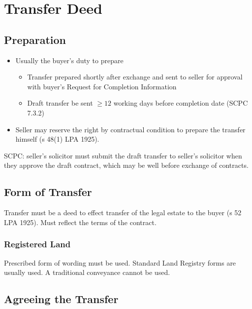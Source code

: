 \documentclass[
]{article}
\providecommand{\tightlist}{%
  \setlength{\itemsep}{0pt}\setlength{\parskip}{0pt}}
\begin{document}
\hypertarget{transfer-deed}{%
\section{Transfer Deed}\label{transfer-deed}}

\hypertarget{preparation}{%
\subsection{Preparation}\label{preparation}}

\begin{itemize}
\tightlist
\item
  Usually the buyer's duty to prepare

  \begin{itemize}
  \tightlist
  \item
    Transfer prepared shortly after exchange and sent to seller for
    approval with buyer's Request for Completion Information
  \item
    Draft transfer be sent \(\geq 12\) working days before completion
    date (SCPC 7.3.2)
  \end{itemize}
\item
  Seller may reserve the right by contractual condition to prepare the
  transfer himself (s 48(1) LPA 1925).
\end{itemize}

SCPC: seller's solicitor must submit the draft transfer to seller's
solicitor when they approve the draft contract, which may be well before
exchange of contracts.

\hypertarget{form-of-transfer}{%
\subsection{Form of Transfer}\label{form-of-transfer}}

Transfer must be a deed to effect transfer of the legal estate to the
buyer (s 52 LPA 1925). Must reflect the terms of the contract.

\hypertarget{registered-land}{%
\subsubsection{Registered Land}\label{registered-land}}

Prescribed form of wording must be used. Standard Land Registry forms
are usually used. A traditional conveyance cannot be used.

\hypertarget{agreeing-the-transfer}{%
\subsection{Agreeing the Transfer}\label{agreeing-the-transfer}}
\end{document}
